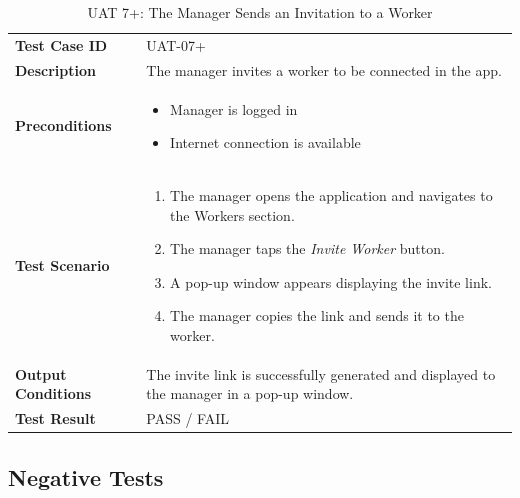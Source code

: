 \documentclass[12pt,a4paper]{article}
\begin{document}
\begin{table}[h]
\centering
\caption{UAT 7+: The Manager Sends an Invitation to a Worker}
\begin{tabularx}{\textwidth}{>{\bfseries}l X}
\toprule
Test Case ID & UAT-07+ \\
Description & The manager invites a worker to be connected in the app. \\
Preconditions &
\begin{itemize}[noitemsep]
    \item Manager is logged in
    \item Internet connection is available
\end{itemize} \\
Test Scenario &
\begin{enumerate}[noitemsep]
    \item The manager opens the application and navigates to the Workers section.
    \item The manager taps the \emph{Invite Worker} button.
    \item A pop-up window appears displaying the invite link.
    \item The manager copies the link and sends it to the worker.
\end{enumerate} \\
Output Conditions & The invite link is successfully generated and displayed to the manager in a pop-up window. \\
Test Result & PASS / FAIL \\
\bottomrule
\end{tabularx}
\end{table}

\subsection*{Negative Tests}
\end{document}

